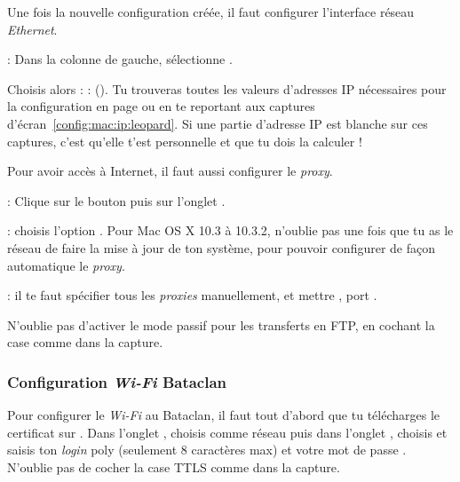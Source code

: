 Une fois la nouvelle configuration créée, il faut configurer l'interface réseau \emph{Ethernet}.



 : Dans la colonne de gauche, sélectionne .

Choisis alors  :%
 :  (). Tu trouveras toutes les valeurs d'adresses IP nécessaires pour la configuration en page \pageref{calcul_ip} ou en te reportant aux captures d'écran~\ref{config:mac:ip:leopard}. Si une partie d'adresse IP est blanche sur ces captures, c'est qu'elle t'est personnelle et que tu dois la calculer !


  
  



Pour avoir accès à Internet, il faut aussi configurer le \emph{proxy}.

 : Clique sur le bouton  puis sur l'onglet .


 :  choisis l'option . Pour Mac OS X 10.3 à 10.3.2, n'oublie pas une fois que tu as le réseau de faire la mise à jour de ton système, pour pouvoir configurer de façon automatique le \emph{proxy}.

 : il te faut spécifier tous les
\emph{proxies} manuellement, et mettre , port .


N'oublie pas d'activer le mode passif pour les transferts en FTP, en cochant la case comme dans la capture.



  
\subsubsection{Configuration \emph{Wi-Fi} Bataclan}
Pour configurer le \emph{Wi-Fi} au Bataclan, il faut tout d'abord que tu télécharges  le certificat sur .
Dans l'onglet , choisis comme réseau  puis dans l'onglet , choisis  et saisis ton \emph{login} poly (seulement 8 caractères max) et votre mot de passe . N'oublie pas de cocher la case TTLS comme dans la capture.

